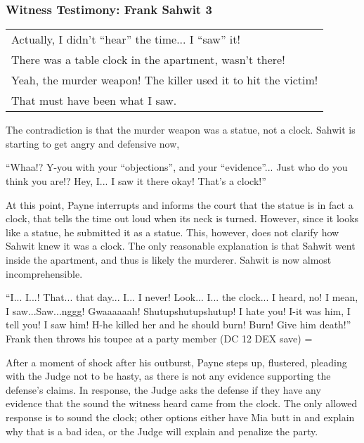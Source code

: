 \subsubsection{Witness Testimony: Frank Sahwit 3}
\begin{center}
\begin{tabular}{p{4in}}
Actually, I didn't ``hear'' the time... I ``saw'' it!\\
There was a table clock in the apartment, wasn't there!\\
Yeah, the murder weapon! The killer used it to hit the victim!\\
That must have been what I saw. \\
\end{tabular}\end{center}

The contradiction is that the murder weapon was a statue, not a clock. Sahwit is starting to get angry and defensive now,\\
\begin{center}
``Whaa!? Y-you with your ``objections'', and your ``evidence''... Just who do you think you are!? Hey, I... I saw it there okay! That's a clock!''
\end{center}
At this point, Payne interrupts and informs the court that the statue is in fact a clock, that tells the time out loud when its neck is turned. However, since it looks like a statue, he submitted it as a statue. This, however, does not clarify how Sahwit knew it was a clock. The only reasonable explanation is that Sahwit went inside the apartment, and thus is likely the murderer. Sahwit is now almost incomprehensible.\\
\begin{center}
``I... I...! That... that day... I... I never! Look... I... the clock... I heard, no! I mean, I saw...Saw...nggg! Gwaaaaaah! Shutupshutupshutup! I hate you! I-it was him, I tell you! I saw him! H-he killed her and he should burn! Burn! Give him death!''\\
Frank then throws his toupee at a party member (DC 12 DEX save)
=\end{center}
After a moment of shock after his outburst, Payne steps up, flustered, pleading with the Judge not to be hasty, as there is not any evidence supporting the defense's claims. In response, the Judge asks the defense if they have any evidence that the sound the witness heard came from the clock. The only allowed response is to sound the clock; other options either have Mia butt in and explain why that is a bad idea, or the Judge will explain and penalize the party. \\
